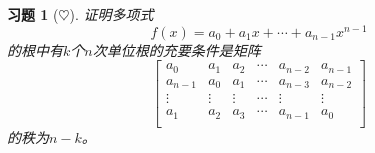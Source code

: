 \documentclass[UTF8]{ctexart}
\newtheorem{ex}[thm]{习题}
\begin{document}
\begin{ex}[$\heartsuit $]
	证明多项式
	\[
	f(x) = a_0 + a_1 x + \cdots +a_{n-1}x^{n-1}
	\]
	的根中有$k$个$n$次单位根的充要条件是矩阵
	\[
	\begin{bmatrix}
		a_0 & a_1 & a_2 & \cdots & a_{n-2} & a_{n-1} \\
		a_{n-1} & a_0 & a_1 &\cdots & a_{n-3} & a_{n-2} \\
		\vdots & \vdots & \vdots & \cdots & \vdots & \vdots \\
		a_1 & a_2 & a_3 & \cdots & a_{n-1} & a_{0} \\
	\end{bmatrix}
	\]
	的秩为$n-k$。
\end{ex}
\end{document}
